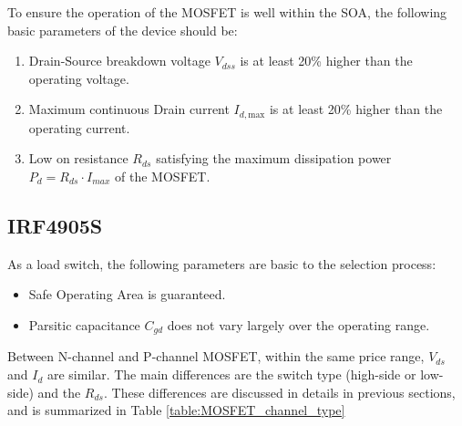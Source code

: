 \documentclass[main.tex]{subfiles}
\begin{document}
    \justify
    To ensure the operation of the MOSFET is well within the SOA, the following basic parameters of the device should be:

    \begin{enumerate}
        \item Drain-Source breakdown voltage $V_{dss}$ is at least 20\% higher than the operating voltage. 
        \item Maximum continuous Drain current $I_{d,\text{max}}$ is at least 20\% higher than the operating current.
        \item Low on resistance $R_{ds}$ satisfying the maximum dissipation power $P_{d}=R_{ds} \cdot I_{max}$ of the MOSFET.
    \end{enumerate}

    \pagebreak
    \subsection{IRF4905S}

    \justify
    As a load switch, the following parameters are basic to the selection process:
    \begin{itemize}
        \item Safe Operating Area is guaranteed.
        \item Parsitic capacitance $C_{gd}$ does not vary largely over the operating range.
    \end{itemize}

    \justify
    Between N-channel and P-channel MOSFET, within the same price range, $V_{ds}$ and $I_d$ are similar. The main differences are the switch type (high-side or low-side) and the $R_{ds}$. These differences are discussed in details in previous sections, and is summarized in Table \ref{table:MOSFET_channel_type}
    
\end{document}
